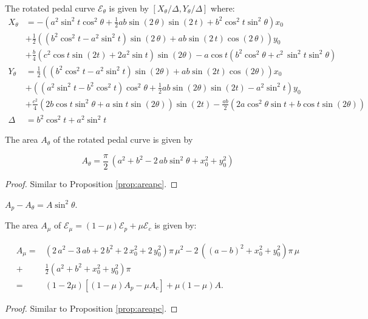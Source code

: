 The rotated pedal curve $\mathcal{E}_{\theta}$ is given by
$[X_\theta/\Delta,Y_\theta/\Delta]$ where:
{\small 
\begin{align*}
 X_\theta &=  - 
  \left(     {a}^{2}  \sin^2  t   
\cos^2\theta +\frac{1}{2} a b\sin \left( 2\,\theta
 \right)  \sin \left( 2\,t \right) +  b^2  \cos^2 t 
  \sin^2\theta  
 \right) {x_0} \\
&+ \frac{1}{2} \left(  (b^2
  \cos^2 t   - {a}^{2} \sin^2t)\sin \left( 2\,\theta \right)
  +ab\sin
 \left( 2\,t \right) \cos \left( 2\,\theta \right)   \right)  y_0
 \\
 &+ \frac{b}{4}(c^2 \cos t \sin(2t) + 2 a^2 \sin{ t} )\sin(2\theta) - a \cos t (b^2\cos^2\theta + c^2\, \sin^2 t\sin^2\theta) 
 \\
 Y_\theta&= \frac{1}{2} \left( (  b^2  \cos^2t -   a^2\sin ^2{t} )  \sin(2\theta)+ a b  \sin (2t)  \cos(2  \theta)       \right)  x_0\\
 &+ \left(  (    a^2 \sin ^2{t}-b^2\cos^2t) \cos^2\theta   +\frac{1}{2} a b  \sin(2\theta)     \sin(2 t)  - a^2  \sin ^2{t}\right)  y_0\\
 &+  \frac{c^2}{4}  \left(2b \cos t\sin^2\theta+ a  \sin {t}   \sin(2\theta)    \right)  \sin(2 t) 
  -\frac{ab}{2}\left(2a \cos^2\theta  \sin {t}   +b \cos{t}  \sin(2\theta)  \right)
   \\
 \Delta&={b}^{2}   \cos^2 t +{a}^{2}\sin^2t
\end{align*}
}

\begin{proposition}
The area $A_\theta$ of the rotated pedal curve is given by

\[ A_\theta=\frac{\pi}{2}\, \left(     {a}^{2}+b^2-2\,ab\sin^2\theta + x_0^{2}+y_0^{2} \right) \]
\end{proposition}

\begin{proof}
Similar to Proposition \ref{prop:areapc}.
\end{proof}

\begin{corollary}
$A_p-A_\theta=A\sin^2\theta$.
\end{corollary}

\begin{proposition}
\label{prop:interpol}
The area $A_\mu$ of $\mathcal{E}_{\mu}=(1-\mu)\mathcal{E}_p+\mu \mathcal{E}_c$ is given by:

\begin{align*} A_{\mu}=& \left(2\,{a}^{2}-3\,ab+2\,b^{2}+2\,x_0^{2}+2\,y_0^{2} \right) \pi\,{\mu}^2 -2\,\left( (a-b)^2  +x_0^{2}
+y_0^{2} \right) \pi\,\mu \\
+&\frac{1}{2}\left( a^2+b^2 +x_0^{2}+y_0^{2} \right) \pi\\
  =&(1-2\mu)[(1-\mu) A_p-\mu A_c]+\mu(1-\mu)A. 
\end{align*}

 
\end{proposition}

\begin{proof}
Similar to Proposition \ref{prop:areapc}. 
\end{proof}